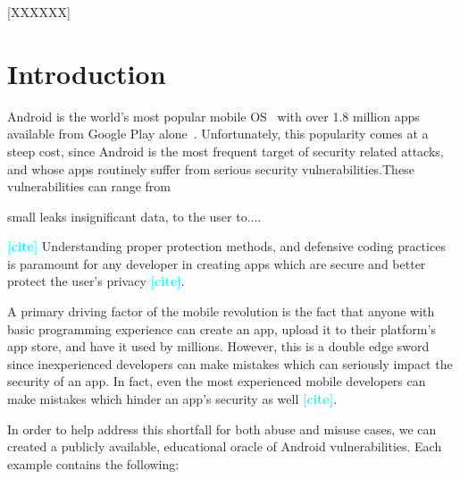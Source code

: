\documentclass{sig-alternate-05-2015}
\newcommand{\todo}[1]{\textcolor{cyan}{\textbf{[#1]}}}
\begin{document}
[XXXXXX]





\section{Introduction}

Android is the world's most popular mobile OS~\cite{OSMarketShare_URL} with over 1.8 million apps available from Google Play alone~\cite{statistica_url}. Unfortunately, this popularity comes at a steep cost, since Android is the most frequent target of security related attacks, and whose apps routinely suffer from serious security vulnerabilities.These vulnerabilities can range from 

small leaks insignificant data, to the user to.... 

\cite{Android_cv_url}

\todo{cite} Understanding proper protection methods, and defensive coding practices is paramount for any developer in creating apps which are secure and better protect the user's privacy \todo{cite}. 



A primary driving factor of the mobile revolution is the fact that anyone with basic programming experience can create an app, upload it to their platform's app store, and have it used by millions. However, this is a double edge sword since  inexperienced developers can make mistakes which can seriously impact the security of an app. In fact, even the most experienced mobile developers can make mistakes which hinder an app's security as well \todo{cite}.





In order to help address this shortfall for both abuse and misuse cases, we can created a publicly available, educational oracle of Android vulnerabilities. Each example contains the following:
\end{document}
